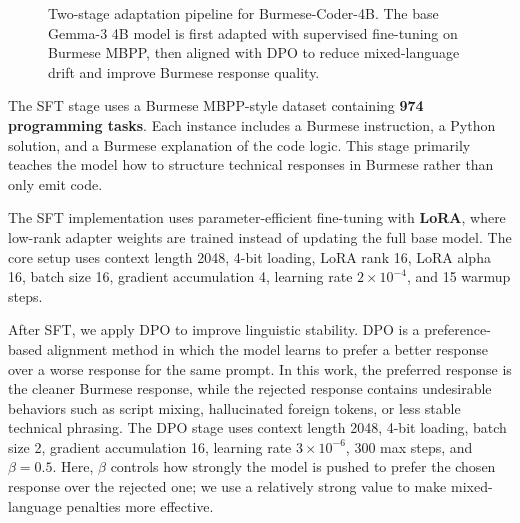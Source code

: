 \documentclass[11pt]{article}
\begin{document}
\begin{figure}[H]
\centering
{}
\caption{Two-stage adaptation pipeline for Burmese-Coder-4B. The base Gemma-3 4B model is first adapted with supervised fine-tuning on Burmese MBPP, then aligned with DPO to reduce mixed-language drift and improve Burmese response quality.}
\label{fig:train_flow}
\end{figure}

The SFT stage uses a Burmese MBPP-style dataset containing \textbf{974 programming tasks}. Each instance includes a Burmese instruction, a Python solution, and a Burmese explanation of the code logic. This stage primarily teaches the model how to structure technical responses in Burmese rather than only emit code.

The SFT implementation uses parameter-efficient fine-tuning with \textbf{LoRA}, where low-rank adapter weights are trained instead of updating the full base model. The core setup uses context length 2048, 4-bit loading, LoRA rank 16, LoRA alpha 16, batch size 16, gradient accumulation 4, learning rate \(2 \times 10^{-4}\), and 15 warmup steps.

After SFT, we apply DPO to improve linguistic stability. DPO is a preference-based alignment method in which the model learns to prefer a better response over a worse response for the same prompt. In this work, the preferred response is the cleaner Burmese response, while the rejected response contains undesirable behaviors such as script mixing, hallucinated foreign tokens, or less stable technical phrasing. The DPO stage uses context length 2048, 4-bit loading, batch size 2, gradient accumulation 16, learning rate \(3 \times 10^{-6}\), 300 max steps, and \(\beta = 0.5\). Here, \(\beta\) controls how strongly the model is pushed to prefer the chosen response over the rejected one; we use a relatively strong value to make mixed-language penalties more effective.
\end{document}
